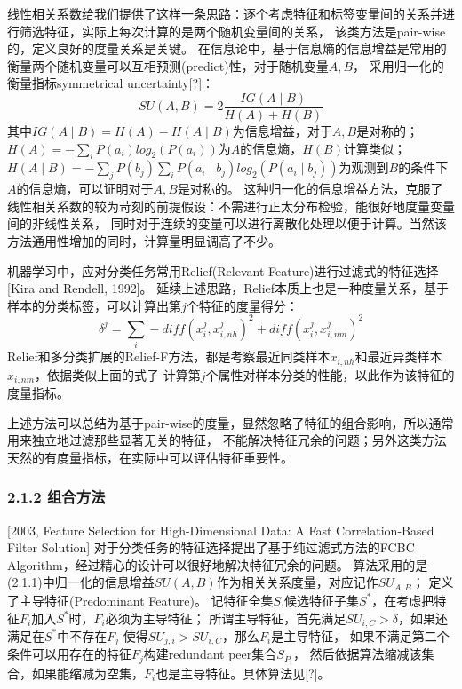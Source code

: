 \documentclass[a4paper,UTF8]{article}
\begin{document}
  线性相关系数给我们提供了这样一条思路：逐个考虑特征和标签变量间的关系并进行筛选特征，实际上每次计算的是两个随机变量间的关系，
  该类方法是pair-wise的，定义良好的度量关系是关键。
  在信息论中，基于信息熵的信息增益是常用的衡量两个随机变量可以互相预测(predict)性，对于随机变量$ A, B $，
  采用归一化的衡量指标symmetrical uncertainty[?]：
  $$ SU(A, B) = 2 \frac{IG(A \mid B)}{H(A)+H(B)} $$
  其中$IG(A \mid B)=H(A)-H(A \mid B)$为信息增益，对于$A,B$是对称的；
  $H(A)=-\sum_{i}P(a_{i})log_{2}(P(a_{i}))$为$A$的信息熵，$H(B)$计算类似；
  $H(A \mid B)=-\sum_{j}P(b_{j})\sum_{i}P(a_{i} \mid b_{j})log_{2}(P(a_{i} \mid b_{j}))$为观测到$B$的条件下
  $A$的信息熵，可以证明对于$A,B$是对称的。
  这种归一化的信息增益方法，克服了线性相关系数的较为苛刻的前提假设：不需进行正太分布检验，能很好地度量变量间的非线性关系，
  同时对于连续的变量可以进行离散化处理以便于计算。当然该方法通用性增加的同时，计算量明显调高了不少。

  机器学习中，应对分类任务常用Relief(Relevant Feature)进行过滤式的特征选择[Kira and Rendell, 1992]。
  延续上述思路，Relief本质上也是一种度量关系，基于样本的分类标签，可以计算出第$j$个特征的度量得分：
  $$ \delta^{j}=\sum_{i}-diff(x_{i}^{j},x_{i,nh}^{j})^{2}+diff(x_{i}^{j},x_{i,nm}^{j})^{2} $$
  Relief和多分类扩展的Relief-F方法，都是考察最近同类样本$x_{i,nh}$和最近异类样本$x_{i,nm}$，依据类似上面的式子
  计算第$j$个属性对样本分类的性能，以此作为该特征的度量指标。

  上述方法可以总结为基于pair-wise的度量，显然忽略了特征的组合影响，所以通常用来独立地过滤那些显著无关的特征，
  不能解决特征冗余的问题；另外这类方法天然的有度量指标，在实际中可以评估特征重要性。


\subsubsection*{2.1.2 组合方法}

[2003, Feature Selection for High-Dimensional Data: A Fast Correlation-Based Filter Solution]
对于分类任务的特征选择提出了基于纯过滤式方法的FCBC Algorithm，经过精心的设计可以很好地解决特征冗余的问题。
算法采用的是(2.1.1)中归一化的信息增益$SU(A,B)$作为相关关系度量，对应记作$SU_{A,B}$；
定义了主导特征(Predominant Feature)。
记特征全集$S$,候选特征子集$S^{*}$，在考虑把特征$F_{i}$加入$S^{*}$时，$F_{i}$必须为主导特征；
所谓主导特征，首先满足$SU_{i,C} > \delta$，如果还满足在$S^{*}$中不存在$F_{j}$
使得$SU_{j,i}>SU_{i,C}$，那么$F_{i}$是主导特征，
如果不满足第二个条件可以用存在的特征$F_{j}$构建redundant peer集合$S_{P_{i}}$，
然后依据算法缩减该集合，如果能缩减为空集，$F_{i}$也是主导特征。具体算法见[?]。
\end{document}
